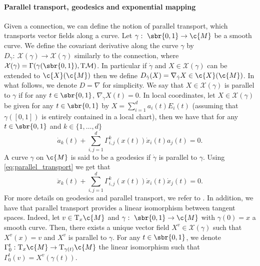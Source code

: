 \paragraph{Parallel transport, geodesics and exponential mapping}
Given a connection, we can define the notion of parallel transport, which transports vector fields along a curve.
Let $\gamma: \ \sbr{0,1} \to \c{M}$ be a smooth curve.
We define the covariant derivative along the curve $\gamma$ by $D_{\dot{\gamma}}: \ \mathcal{X}(\gamma) \to \mathcal{X}(\gamma)$ similarly to the connection, where $\mathcal{X}(\gamma) = \Gamma(\gamma(\sbr{0,1}), \TM)$.
In particular if $\dot{\gamma}$ and $X \in \mathcal{X}(\gamma)$ can be extended to $\c{X}(\c{M})$ then we define $D_{\dot{\gamma}}(X) = \nabla_{\dot{\gamma}}X \in \c{X}(\c{M})$.
In what follows, we denote $D = \nabla$ for simplicity.
We say that $X \in \mathcal{X}(\gamma)$ is parallel to $\gamma$ if for any $t \in \sbr{0,1}$, $\nabla_{\dot{\gamma}}X(t) = 0$.
In local coordinates, let $X \in \mathcal{X}(\gamma)$ be given for any $t \in \sbr{0,1}$ by $X = \sum_{i=1}^d a_i(t) E_i(t)$ (assuming that $\gamma([0,1])$ is entirely contained in a local chart), then we have that for any $t \in \sbr{0,1}$ and $k \in \{1, \dots, d\}$ \begin{equation} \label{eq:parallel_transport} \textstyle{\dot{a}_k(t) + \sum_{i,j=1}^d \Gamma_{i,j}^k(x(t)) \dot{x}_i(t) a_j(t) = 0 .
	}
\end{equation}
A curve $\gamma$ on $\c{M}$ is said to be a geodesics if $\dot{\gamma}$ is parallel to $\gamma$.
Using \cref{eq:parallel_transport} we get that \begin{equation} \label{eq:geodesics} \textstyle{\ddot{x}_k(t) + \sum_{i,j=1}^d \Gamma_{i,j}^k(x(t)) \dot{x}_i(t) \dot{x}_j(t) = 0 .
	}
\end{equation}
For more details on geodesics and parallel transport, we refer to \textcite[Chapter 4]{lee2018introduction}.
In addition, we have that parallel transport provides a linear isomorphism between tangent spaces.
Indeed, let $v \in \mathrm{T}_x \c{M}$ and $\gamma: \ \sbr{0,1} \to \c{M}$ with $\gamma(0) = x$ a smooth curve.
Then, there exists a unique vector field $X^v \in \mathcal{X}(\gamma)$ such that $X^v(x) = v$ and $X^v$ is parallel to $\gamma$.
For any $t \in \sbr{0,1}$, we denote $\Gamma_0^t: \mathrm{T}_{x} \c{M} \to \mathrm{T}_{\gamma(t)} \c{M}$ the linear isomorphism such that $\Gamma_0^t(v) = X^v(\gamma(t))$.

